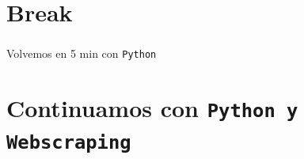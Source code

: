 \documentclass[
  shownotes,
  xcolor={svgnames},
  hyperref={colorlinks,citecolor=DarkBlue,linkcolor=DarkRed,urlcolor=DarkBlue}
  , aspectratio=169]{beamer}
\begin{document}
\section{Break}
\begin{frame}
\frametitle{}

\begin{centering}
\huge
\textcolor{andesred}{Volvemos en 5 min con \texttt{Python} }

\end{centering}

\end{frame}
\section{Continuamos con \texttt{Python y Webscraping}}


\end{document}
